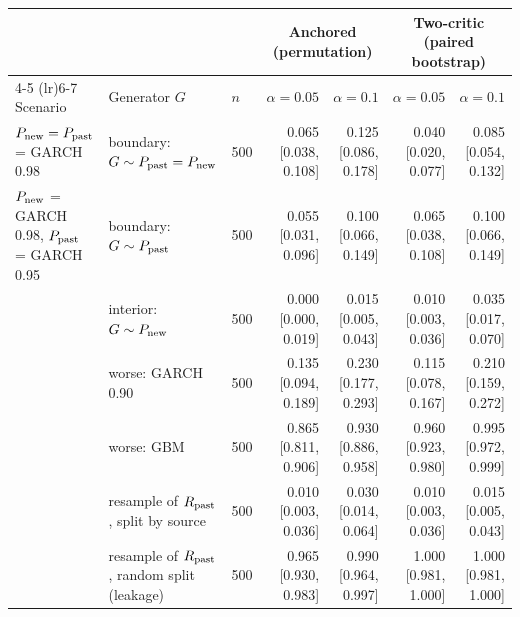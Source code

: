 \begin{tabular}{lllrrrr}
\toprule
 &  &  & \multicolumn{2}{c}{Anchored (permutation)} & \multicolumn{2}{c}{Two-critic (paired bootstrap)} \\
\cmidrule(lr){4-5} \cmidrule(lr){6-7}
Scenario & Generator $G$ & $n$ & $\alpha=0.05$ & $\alpha=0.1$ & $\alpha=0.05$ & $\alpha=0.1$ \\
\midrule
$P_{\rm new}=P_{\rm past}$ = GARCH 0.98 & boundary: $G\sim P_{\rm past}=P_{\rm new}$ & 500 & 0.065 [0.038, 0.108] & 0.125 [0.086, 0.178] & 0.040 [0.020, 0.077] & 0.085 [0.054, 0.132] \\
$P_{\rm new}$ = GARCH 0.98, $P_{\rm past}$ = GARCH 0.95 & boundary: $G\sim P_{\rm past}$ & 500 & 0.055 [0.031, 0.096] & 0.100 [0.066, 0.149] & 0.065 [0.038, 0.108] & 0.100 [0.066, 0.149] \\
 & interior: $G\sim P_{\rm new}$ & 500 & 0.000 [0.000, 0.019] & 0.015 [0.005, 0.043] & 0.010 [0.003, 0.036] & 0.035 [0.017, 0.070] \\
 & worse: GARCH 0.90 & 500 & 0.135 [0.094, 0.189] & 0.230 [0.177, 0.293] & 0.115 [0.078, 0.167] & 0.210 [0.159, 0.272] \\
 & worse: GBM & 500 & 0.865 [0.811, 0.906] & 0.930 [0.886, 0.958] & 0.960 [0.923, 0.980] & 0.995 [0.972, 0.999] \\
 & resample of $R_{\rm past}$, split by source & 500 & 0.010 [0.003, 0.036] & 0.030 [0.014, 0.064] & 0.010 [0.003, 0.036] & 0.015 [0.005, 0.043] \\
 & resample of $R_{\rm past}$, random split (leakage) & 500 & 0.965 [0.930, 0.983] & 0.990 [0.964, 0.997] & 1.000 [0.981, 1.000] & 1.000 [0.981, 1.000] \\
\bottomrule
\end{tabular}
